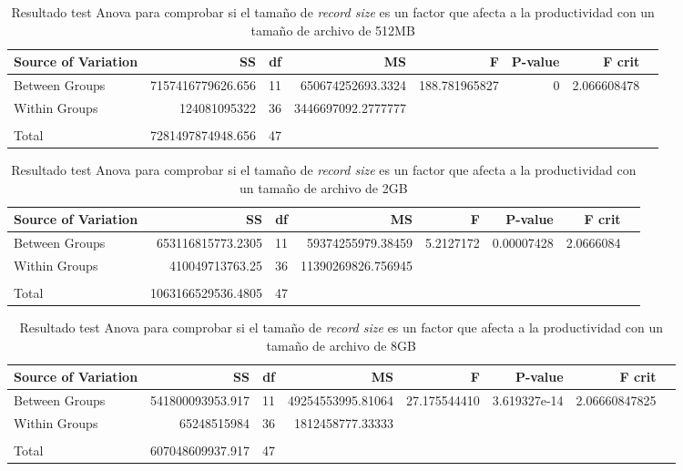 \begin{table}[H]\centering
\scriptsize
\begin{tabular}{lrrrrrrr}\toprule
Source of Variation &SS &df &MS &F &P-value &F crit \\\midrule
Between Groups &7157416779626.656 &11 &650674252693.3324 &188.781965827 &0 &2.066608478 \\
Within Groups &124081095322 &36 &3446697092.2777777 & & & \\
& & & & & & \\
Total &7281497874948.656 &47 & & & & \\
\bottomrule
\end{tabular}
\caption{Resultado test Anova para comprobar si el tamaño de \textit{record size} es un factor que afecta a la productividad con un tamaño de archivo de 512MB}\label{tab:5.7}
\end{table}

\begin{table}[H]\centering

\scriptsize
\begin{tabular}{lrrrrrrr}\toprule
Source of Variation &SS &df &MS &F &P-value &F crit \\\midrule
Between Groups &653116815773.2305 &11 &59374255979.38459 &5.2127172 &0.00007428 &2.0666084 \\
Within Groups &410049713763.25 &36 &11390269826.756945 & & & \\
& & & & & & \\
Total &1063166529536.4805 &47 & & & & \\
\bottomrule
\end{tabular}
\caption{Resultado test Anova para comprobar si el tamaño de \textit{record size} es un factor que afecta a la productividad con un tamaño de archivo de 2GB}\label{tab:5.8}
\end{table}

\begin{table}[!htp]\centering

\scriptsize
\begin{tabular}{lrrrrrrr}\toprule
Source of Variation &SS &df &MS &F &P-value &F crit \\\midrule
Between Groups &541800093953.917 &11 &49254553995.81064 &27.175544410 &3.619327e-14 &2.06660847825 \\
Within Groups &65248515984 &36 &1812458777.33333 & & & \\
& & & & & & \\
Total &607048609937.917 &47 & & & & \\
\bottomrule
\end{tabular}
\caption{Resultado test Anova para comprobar si el tamaño de \textit{record size} es un factor que afecta a la productividad con un tamaño de archivo de 8GB}\label{tab:5.9}
\end{table}


